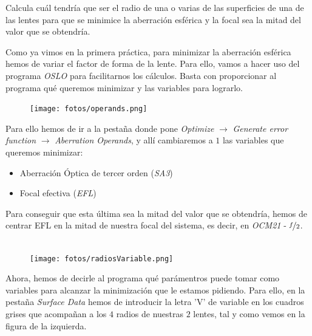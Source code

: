 \documentclass[11pt]{article}
\newcommand{\preguntaAlaMadreDeRocio}[1]{\begin{Theorem}{#1}{}\end{Theorem}}
\begin{document}
        \clearpage
        \preguntaAlaMadreDeRocio{Calcula cuál tendría que ser el radio de una o varias de las superficies de una de las lentes para que se minimice la aberración esférica y la focal sea la mitad del valor que se obtendría.}
        
        \noindent Como ya vimos en la primera práctica, para minimizar la aberración esférica hemos de variar el factor de forma de la lente. Para ello, vamos a hacer uso del programa \textit{OSLO} para facilitarnos los cálculos. Basta con proporcionar al programa qué queremos minimizar y las variables para lograrlo.\\

        \begin{figure}
            \vspace{-0.5cm}
            \centering
            \texttt{[image: fotos/operands.png]}
        \end{figure}
        
        \noindent Para ello hemos de ir a la pestaña donde pone \textit{Optimize} $\to$ \textit{Generate error function} $\to$ \textit{Aberration Operands}, y allí cambiaremos a $1$ las variables que queremos minimizar: 
        \begin{itemize}
            \item Aberración Óptica de tercer orden (\textit{SA3})
            \item Focal efectiva (\textit{EFL})
        \end{itemize}
        
        \noindent Para conseguir que esta última sea la mitad del valor que se obtendría, hemos de centrar EFL en la mitad de nuestra focal del sistema, es decir, en \textit{OCM21} - $\nicefrac{f}{2}$.\\ \hspace{0cm}\\

        \begin{figure}
            \vspace{-0.5cm}
            \centering
            \texttt{[image: fotos/radiosVariable.png]}
        \end{figure}
        
        \noindent Ahora, hemos de decirle al programa qué parámentros puede tomar como variables para alcanzar la minimización que le estamos pidiendo. Para ello, en la pestaña \textit{Surface Data} hemos de introducir la letra 'V' de variable en los cuadros grises que acompañan a los $4$ radios de nuestras $2$ lentes, tal y como vemos en la figura de la izquierda.\\
\end{document}

